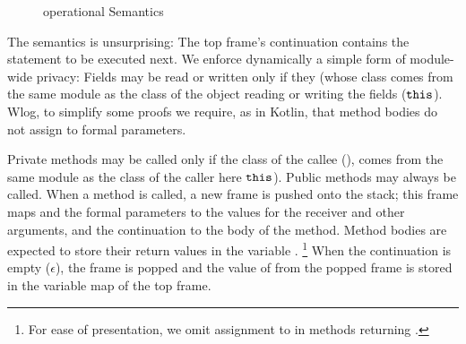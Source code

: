 \begin{figure}[bt]
\begin{minipage}{\textwidth}
{
 }
\end{minipage}
 \caption{\LangOO operational Semantics}
\label{f:loo-semantics}
\end{figure}

The semantics is unsurprising:  
The  top frame's continuation  contains the statement to be  executed next.  
We enforce dynamically a simple form of module-wide privacy: 
Fields may be read or written only if they   (whose class comes from the same module as the  class of the object 
reading or writing the fields ($\mbox{\normalfont{\texttt{this}}}$). %
Wlog, {to simplify some proofs} we  require, as in Kotlin, that method bodies do not assign to formal parameters.

Private methods may be called only if the class of %
the callee (), %
comes from the same module as the  class of the caller  here $\mbox{\normalfont{\texttt{this}}}$).
Public methods may always be called.
When a method is called, a new frame is pushed onto the stack; this frame  maps  and the formal parameters to  the values for the receiver and other arguments, and the continuation to the body of the method. 
Method bodies are expected to store their return values in the  variable .
\footnote{For ease of presentation, we omit assignment to  in methods returning .} %
  When the continuation is  empty ($\epsilon$), the frame is popped and the value of 
 from the popped frame  is stored  in the variable map of the top frame.

